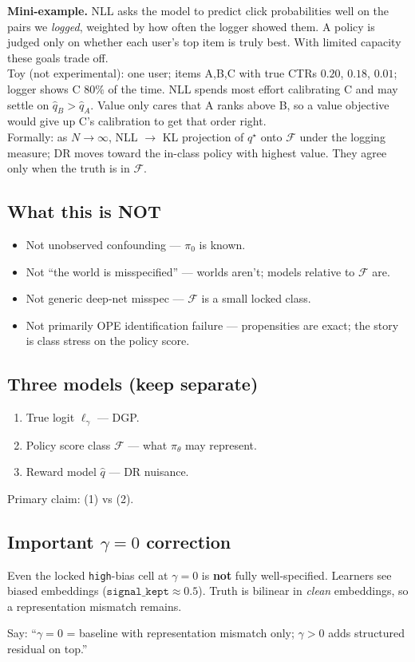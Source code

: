\documentclass[11pt]{article}
\newcommand{\phonesub}[1]{\Needspace{6\baselineskip}\subsection*{#1}}
\newcommand{\miniex}[1]{\par{\footnotesize\color{black!70}\textbf{Mini-example.} #1\par}}
\begin{document}
\miniex{NLL asks the model to predict click
probabilities well on the pairs we
\emph{logged}, weighted by how often the
logger showed them.  A policy is judged only
on whether each user's top item is truly
best.  With limited capacity these goals
trade off.\\[0.3em]
Toy (not experimental): one user; items
A,B,C with true CTRs $0.20$, $0.18$, $0.01$;
logger shows C $80\%$ of the time.  NLL
spends most effort calibrating C and may
settle on $\hat q_B>\hat q_A$.  Value only
cares that A ranks above B, so a value
objective would give up C's calibration to
get that order right.\\[0.3em]
Formally: as $N\to\infty$, NLL $\to$ KL
projection of $q^{\star}$ onto $\mathcal{F}$
under the logging measure; DR moves toward
the in-class policy with highest value.
They agree only when the truth is in
$\mathcal{F}$.}

\phonesub{What this is NOT}
\begin{itemize}
  \item Not unobserved confounding ---
        $\pi_{0}$ is known.
  \item Not ``the world is misspecified'' ---
        worlds aren't; models relative to
        $\mathcal{F}$ are.
  \item Not generic deep-net misspec ---
        $\mathcal{F}$ is a small locked class.
  \item Not primarily OPE identification
        failure --- propensities are exact;
        the story is class stress on the
        policy score.
\end{itemize}

\phonesub{Three models (keep separate)}
\begin{enumerate}
  \item True logit $\ell_{\gamma}$ --- DGP.
  \item Policy score class $\mathcal{F}$ ---
        what $\pi_{\theta}$ may represent.
  \item Reward model $\hat{q}$ --- DR
        nuisance.
\end{enumerate}
Primary claim: (1) vs (2).

\phonesub{Important $\gamma{=}0$ correction}
Even the locked \texttt{high}-bias cell at
$\gamma{=}0$ is \textbf{not} fully
well-specified.  Learners see biased
embeddings ($\texttt{signal\_kept}\approx 0.5$).
Truth is bilinear in \emph{clean} embeddings,
so a representation mismatch remains.

Say: ``$\gamma{=}0$ = baseline with
representation mismatch only; $\gamma{>}0$
adds structured residual on top.''
\end{document}
